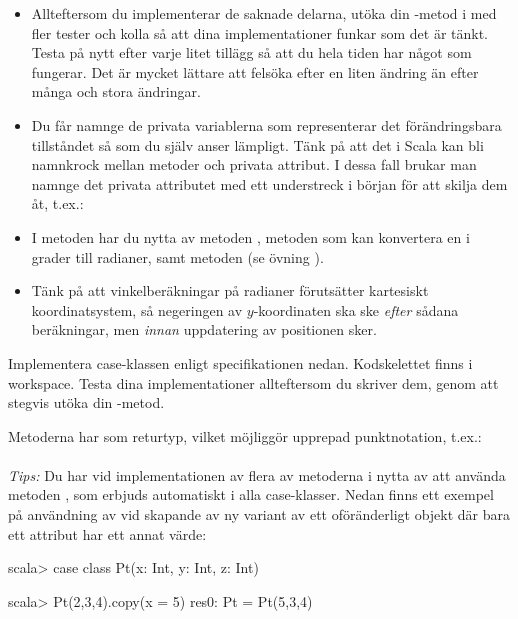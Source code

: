 \begin{itemize}
\item Allteftersom du implementerar de saknade delarna, utöka din -metod i  med fler tester och kolla så att dina implementationer funkar som det är tänkt. Testa på nytt efter varje litet tillägg så att du hela tiden har något som fungerar. Det är mycket lättare att felsöka efter en liten ändring än efter många och stora ändringar.

\item Du får namnge de privata variablerna som representerar det förändringsbara tillståndet så som du själv anser lämpligt. Tänk på att det i Scala kan bli namnkrock mellan metoder och privata attribut. I dessa fall brukar man namnge det privata attributet med ett understreck i början för att skilja dem åt, t.ex.: \\

\item I metoden  har du nytta av metoden , metoden  som kan konvertera en  i grader till radianer, samt metoden  (se övning \texttt{\ExeWeekFIVE}).

\item Tänk på att vinkelberäkningar på radianer förutsätter kartesiskt koordinatsystem, så negeringen av $y$-koordinaten ska ske \emph{efter} sådana beräkningar, men \emph{innan} uppdatering av positionen sker.

\end{itemize}


\Task Implementera case-klassen  enligt specifikationen nedan. Kodskelettet finns i workspace. Testa dina implementationer allteftersom du skriver dem, genom att stegvis utöka din -metod.

\begin{figure}[H]
\end{figure}

\noindent Metoderna har  som returtyp, vilket möjliggör upprepad punktnotation, t.ex.:\\
\\
\emph{Tips:} Du har vid implementationen av flera av metoderna i  nytta av att använda metoden , som erbjuds automatiskt i alla case-klasser. Nedan finns ett exempel på användning av  vid skapande av ny variant av ett oföränderligt objekt där bara ett attribut har ett annat värde:
\begin{REPLnonum}
scala> case class Pt(x: Int, y: Int, z: Int)

scala> Pt(2,3,4).copy(x = 5)
res0: Pt = Pt(5,3,4)
\end{REPLnonum}

